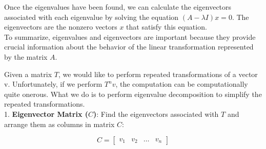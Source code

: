 \documentclass[10pt,a4paper]{Template}
\begin{document}
\begin{minipage}{0.48\textwidth}
Once the eigenvalues have been found, we can calculate the eigenvectors associated with each eigenvalue by solving the equation $(A-\lambda I)x=0$. The eigenvectors are the nonzero vectors $x$ that satisfy this equation. \\

To summarize, eigenvalues and eigenvectors are important because they provide crucial information about the behavior of the linear transformation represented by the matrix $A$.

\divider

Given a matrix $T$, we would like to perform repeated transformations of a vector v. Unfortunately, if we perform $T^n v$, the computation can be computationally quite onerous. What we do is to perform eigenvalue decomposition to simplify the repeated transformations. \\

1. \textbf{Eigenvector Matrix ($C$)}: Find the eigenvectors associated with $T$ and arrange them as columns in matrix $C$:

\[ C = \begin{bmatrix} v_1 & v_2 & \dots & v_n \end{bmatrix} \]

\end{minipage}
\hfill
\end{document}
